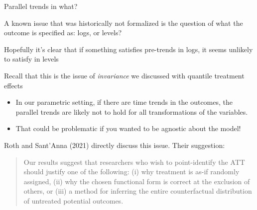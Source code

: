 \documentclass[notes,11pt, aspectratio=169]{beamer}
\newenvironment{wideitemize}{\itemize\addtolength{\itemsep}{10pt}}{\enditemize}
\begin{document}
\begin{frame}{Parallel trends in what?}
  \begin{wideitemize}
  \item A known issue that was historically not formalized is the
    question of what the outcome is specified as: logs, or levels?
  \item Hopefully it's clear that if something satisfies pre-trends in
    logs, it seems unlikely to satisfy in levels
  \item Recall that this is the issue of \emph{invariance} we
    discussed with quantile treatment effects
    \begin{itemize}
    \item In our parametric setting, if there are time trends in the
      outcomes, the parallel trends are likely not to hold for all
      transformations of the variables.
    \item That could be problematic if you wanted to be agnostic about
      the model!
    \end{itemize}
  \item Roth and Sant'Anna (2021) directly discuss this issue. Their suggestion:
    \begin{quote}
      Our results suggest that researchers who wish to point-identify
      the ATT should justify one of the following: (i) why treatment
      is as-if randomly assigned, (ii) why the chosen functional form
      is correct at the exclusion of others, or (iii) a method for
      inferring the entire counterfactual distribution of untreated
      potential outcomes.
    \end{quote}
  \end{wideitemize}
\end{frame}
\end{document}
